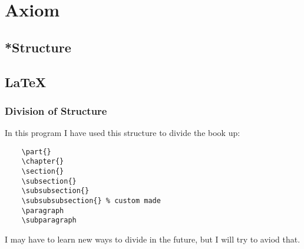 \chapter{Axiom}
\section{*Structure}

\section{LaTeX}
\subsection{Division of Structure}
In this program I have used this structure to divide the book up:
\begin{verbatim}
    \part{}
    \chapter{}
    \section{}
    \subsection{}
    \subsubsection{}
    \subsubsubsection{} % custom made
    \paragraph
    \subparagraph
\end{verbatim}
I may have to learn new ways to divide in the future, but I will try to aviod that.
